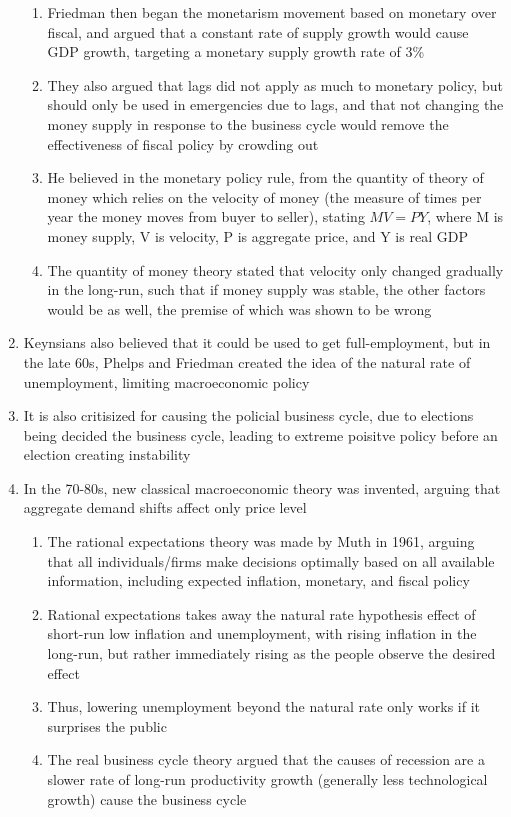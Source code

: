 \begin{enumerate}
\begin{enumerate}
\item Friedman then began the monetarism movement based on monetary over fiscal, and argued that a constant rate of supply growth would cause GDP growth, targeting a monetary supply growth rate of 3\%
\item They also argued that lags did not apply as much to monetary policy, but should only be used in emergencies due to lags, and that not changing the money supply in response to the business cycle would remove the effectiveness of fiscal policy by crowding out
\item He believed in the monetary policy rule, from the quantity of theory of money which relies on the velocity of money (the measure of times per year the money moves from buyer to seller), stating $MV = PY$, where M is money supply, V is velocity, P is aggregate price, and Y is real GDP
\item The quantity of money theory stated that velocity only changed gradually in the long-run, such that if money supply was stable, the other factors would be as well, the premise of which was shown to be wrong
\end{enumerate}
\item Keynsians also believed that it could be used to get full-employment, but in the late 60s, Phelps and Friedman created the idea of the natural rate of unemployment, limiting macroeconomic policy
\item It is also critisized for causing the policial business cycle, due to elections being decided the business cycle, leading to extreme poisitve policy before an election creating instability
\item In the 70-80s, new classical macroeconomic theory was invented, arguing that aggregate demand shifts affect only price level
\begin{enumerate}
\item The rational expectations theory was made by Muth in 1961, arguing that all individuals/firms make decisions optimally based on all available information, including expected inflation, monetary, and fiscal policy
\item Rational expectations takes away the natural rate hypothesis effect of short-run low inflation and unemployment, with rising inflation in the long-run, but rather immediately rising as the people observe the desired effect
\item Thus, lowering unemployment beyond the natural rate only works if it surprises the public
\item The real business cycle theory argued that the causes of recession are a slower rate of long-run productivity growth (generally less technological growth) cause the business cycle

\end{enumerate}
\end{enumerate}
